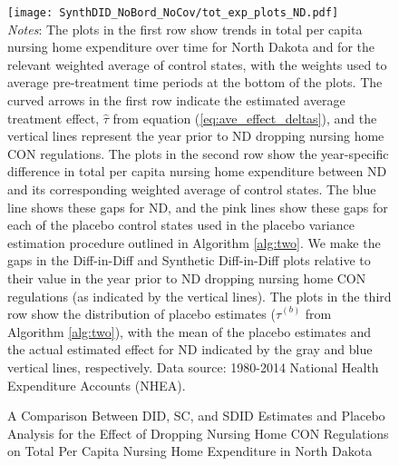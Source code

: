 \documentclass[../Main.tex]{subfiles}
\begin{document}
\newpage
{}
\begin{figure}[t] 
    \setlength{}
	\caption{\label{fig:tot_exp_plots_nd} \centering A Comparison Between DID, SC, and SDID Estimates and Placebo Analysis for the Effect of Dropping Nursing Home CON Regulations on Total Per Capita Nursing Home Expenditure in North Dakota} {\centering\texttt{[image: SynthDID\_NoBord\_NoCov/tot\_exp\_plots\_ND.pdf]}}
    \vspace{-1.4cm}\\
    \scriptsize
		\textit{Notes}: The plots in the first row show trends in total per capita nursing home expenditure over time for North Dakota and for the relevant weighted average of control states, with the weights used to average pre-treatment time periods at the bottom of the plots. The curved arrows in the first row indicate the estimated average treatment effect, $\hat{\tau}$ from equation (\ref{eq:ave_effect_deltas}), and the vertical lines represent the year prior to ND dropping nursing home CON regulations. The plots in the second row show the year-specific difference in total per capita nursing home expenditure between ND and its corresponding weighted average of control states. The blue line shows these gaps for ND, and the pink lines show these gaps for each of the placebo control states used in the placebo variance estimation procedure outlined in Algorithm \ref{alg:two}. We make the gaps in the Diff-in-Diff and Synthetic Diff-in-Diff plots relative to their value in the year prior to ND dropping nursing home CON regulations (as indicated by the vertical lines). The plots in the third row show the distribution of placebo estimates ($\hat{\tau}^{(b)}$ from Algorithm \ref{alg:two}), with the mean of the placebo estimates and the actual estimated effect for ND indicated by the gray and blue vertical lines, respectively. Data source: 1980-2014 National Health Expenditure Accounts (NHEA).
\end{figure}
\restoregeometry
\clearpage
\end{document}

